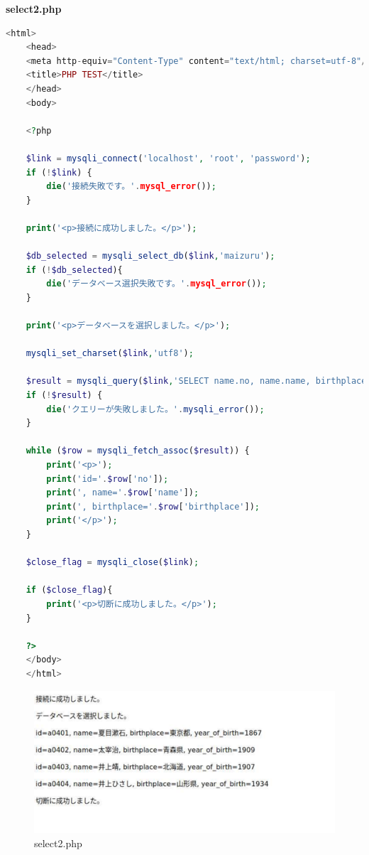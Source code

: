 \textbf{select2.php}
\begin{lstlisting}[language=php]
    <html>
    <head>
    <meta http-equiv="Content-Type" content="text/html; charset=utf-8"/>
    <title>PHP TEST</title>
    </head>
    <body>
    
    <?php
    
    $link = mysqli_connect('localhost', 'root', 'password');
    if (!$link) {
        die('接続失敗です。'.mysql_error());
    }
    
    print('<p>接続に成功しました。</p>');
    
    $db_selected = mysqli_select_db($link,'maizuru');
    if (!$db_selected){
        die('データベース選択失敗です。'.mysql_error());
    }
    
    print('<p>データベースを選択しました。</p>');
    
    mysqli_set_charset($link,'utf8');
    
    $result = mysqli_query($link,'SELECT name.no, name.name, birthplace.birthplace FROM name inner join birthplace on name.name=birthplace.name');
    if (!$result) {
        die('クエリーが失敗しました。'.mysqli_error());
    }
    
    while ($row = mysqli_fetch_assoc($result)) {
        print('<p>');
        print('id='.$row['no']);
        print(', name='.$row['name']);
        print(', birthplace='.$row['birthplace']);
        print('</p>');
    }
    
    $close_flag = mysqli_close($link);
    
    if ($close_flag){
        print('<p>切断に成功しました。</p>');
    }
    
    ?>
    </body>
    </html>
\end{lstlisting}
\begin{figure}[htbp]
  \centering
  \includegraphics[width=0.9\linewidth]{figure/8.pdf}
  \caption{select2.php}
\end{figure}

